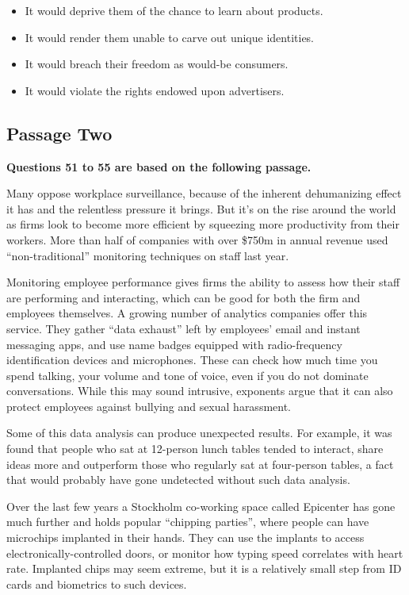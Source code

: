 \documentclass[UTF8,11pt]{ctexart}
\begin{document}
\begin{itemize}[leftmargin=2em,itemsep=.2em,topsep=.4em]\item[A.] It would deprive them of the chance to learn about products.
\item[B.] It would render them unable to carve out unique identities.
\item[C.] It would breach their freedom as would-be consumers.
\item[D.] It would violate the rights endowed upon advertisers.
\end{itemize}

\subsection*{\textbf{Passage Two}}


\textbf{Questions 51 to 55 are based on the following passage.}


Many oppose workplace surveillance, because of the inherent dehumanizing effect it has and the relentless pressure it brings. But it’s on the rise around the world as firms look to become more efficient by squeezing more productivity from their workers. More than half of companies with over \$750m in annual revenue used “non-traditional” monitoring techniques on staff last year.


Monitoring employee performance gives firms the ability to assess how their staff are performing and interacting, which can be good for both the firm and employees themselves. A growing number of analytics companies offer this service. They gather “data exhaust” left by employees’ email and instant messaging apps, and use name badges equipped with radio-frequency identification devices and microphones. These can check how much time you spend talking, your volume and tone of voice, even if you do not dominate conversations. While this may sound intrusive, exponents argue that it can also protect employees against bullying and sexual harassment.


Some of this data analysis can produce unexpected results. For example, it was found that people who sat at 12-person lunch tables tended to interact, share ideas more and outperform those who regularly sat at four-person tables, a fact that would probably have gone undetected without such data analysis.


Over the last few years a Stockholm co-working space called Epicenter has gone much further and holds popular “chipping parties”, where people can have microchips implanted in their hands. They can use the implants to access electronically-controlled doors, or monitor how typing speed correlates with heart rate. Implanted chips may seem extreme, but it is a relatively small step from ID cards and biometrics to such devices.
\end{document}
